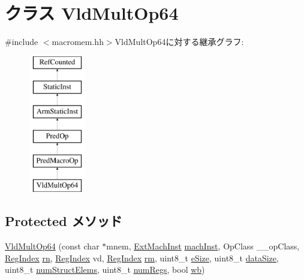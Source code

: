 \hypertarget{classArmISA_1_1VldMultOp64}{
\section{クラス VldMultOp64}
\label{classArmISA_1_1VldMultOp64}
}


{\ttfamily \#include $<$macromem.hh$>$}VldMultOp64に対する継承グラフ:\begin{figure}[H]
\begin{center}
\leavevmode
\includegraphics[height=6cm]{classArmISA_1_1VldMultOp64}
\end{center}
\end{figure}
\subsection*{Protected メソッド}
\begin{DoxyCompactItemize}
\item 
\hyperlink{classArmISA_1_1VldMultOp64_a355647a38deb45ea21e749e81606300b}{VldMultOp64} (const char $\ast$mnem, \hyperlink{classStaticInst_a5605d4fc727eae9e595325c90c0ec108}{ExtMachInst} \hyperlink{classStaticInst_a744598b194ca3d4201d9414ce4cc4af4}{machInst}, OpClass \_\-\_\-opClass, \hyperlink{classStaticInst_a36d25e03e43fa3bb4c5482cbefe5e0fb}{RegIndex} \hyperlink{namespaceArmISA_adf8c6c579ad8729095a637a4f2181211}{rn}, \hyperlink{classStaticInst_a36d25e03e43fa3bb4c5482cbefe5e0fb}{RegIndex} vd, \hyperlink{classStaticInst_a36d25e03e43fa3bb4c5482cbefe5e0fb}{RegIndex} \hyperlink{namespaceArmISA_ad546c2cf2168cf2d8ac21b2a9f485e82}{rm}, uint8\_\-t \hyperlink{classArmISA_1_1VldMultOp64_aac129ded07ba57383c5e2540f22c94ef}{eSize}, uint8\_\-t \hyperlink{classArmISA_1_1VldMultOp64_af13e629a2f79d14821c7b9246ef99e9f}{dataSize}, uint8\_\-t \hyperlink{classArmISA_1_1VldMultOp64_afb0be420b537599a5b86558127502040}{numStructElems}, uint8\_\-t \hyperlink{classArmISA_1_1VldMultOp64_a7a5268882c913c394a8ad4d988eb94e6}{numRegs}, bool \hyperlink{classArmISA_1_1VldMultOp64_a93541ed16711b2c9c53cf093b675d90b}{wb})
\end{DoxyCompactItemize}
